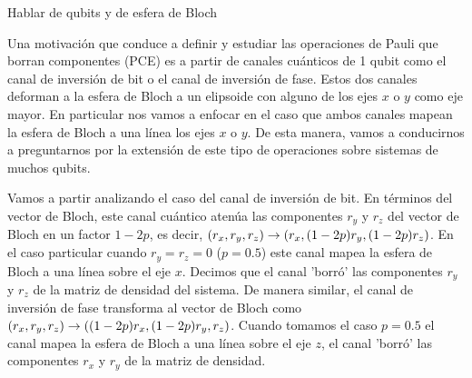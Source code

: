 
Hablar de qubits y de esfera de Bloch

Una motivación que conduce a definir y estudiar las operaciones 
de Pauli que borran componentes (PCE) es a partir 
de canales cuánticos de 1 qubit como el canal de inversión
de bit o el canal de inversión de fase. Estos dos canales deforman
a la esfera de Bloch a un elipsoide con alguno de los ejes $x$ o $y$ como
eje mayor. En particular nos vamos a enfocar en el caso que ambos canales
mapean la esfera de Bloch a una línea los ejes $x$ o $y$. De esta manera, 
vamos a conducirnos a preguntarnos por la extensión de este tipo 
de operaciones sobre sistemas de muchos qubits.

Vamos a partir analizando el caso del canal de inversión de bit. 
En términos del vector de Bloch, este canal cuántico atenúa las 
componentes $r_y$ y $r_z$ del vector de Bloch en un factor $1-2p$, 
es decir, $(r_x,r_y,r_z)\to\qty(r_x,(1-2p)r_y,(1-2p)r_z)$.
En el caso particular cuando $r_y=r_z=0$ ($p=0.5$) 
este canal mapea la esfera de Bloch a una línea sobre el eje $x$.
Decimos que el canal 'borró' las componentes $r_y$ y $r_z$ de
la matriz de densidad del sistema. De manera similar, el canal 
de inversión de fase transforma al vector de Bloch como 
$(r_x,r_y,r_z)\to\qty((1-2p)r_x,(1-2p)r_y,r_z)$. Cuando tomamos 
el caso $p=0.5$ el canal mapea la esfera de Bloch a una 
línea sobre el eje $z$, el canal 'borró' las componentes $r_x$ y $r_y$
de la matriz de densidad.


